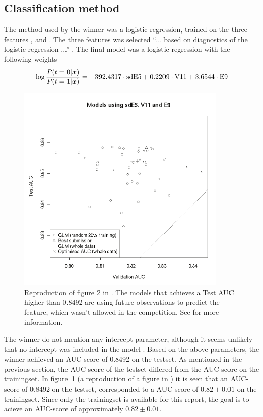 \subsection{Classification method}
The method used by the winner was a logistic regression, trained on the three features ,  and . The three features was selected ``... based on diagnostics of the logistic regression ...'' \citep[p.3]{inference_winning_approach}. The final model was a logistic regression with the following weights
\[
    \log\frac{P(t=0|\boldsymbol{x})}{P(t=1|\boldsymbol{x})} = -392.4317\cdot\text{sdE5} + 0.2209\cdot\text{V11} + 3.6544\cdot\text{E9}
\]
\begin{figure}
    \centering
    \includegraphics[width=100mm]{media/fig2-inference-paper.pdf}
    \caption{Reproduction of figure 2 in \citet{inference_winning_approach}. The models that achieves a Test AUC higher than 0.8492 are using future observations to predict the  feature, which wasn't allowed in the competition. See \citet{inference_winning_approach} for more information.}\label{fig:auc-score-inference-paper}
\end{figure}
The winner do not mention any intercept parameter, although it seems unlikely that no intercept was included in the model \citep{meetings-morten}. Based on the above parameters, the winner achieved an AUC-score of 0.8492 on the testset. As mentioned in the previous section, the AUC-score of the testset differed from the AUC-score on the trainingset. In figure~\ref{fig:auc-score-inference-paper} (a reproduction of a figure in \citet{inference_winning_approach}) it is seen that an AUC-score of 0.8492 on the testset, corresponded to a AUC-score of $0.82\pm0.01$ on the trainingset. Since only the trainingset is available for this report, the goal is to acieve an AUC-score of approximately $0.82\pm0.01$.

